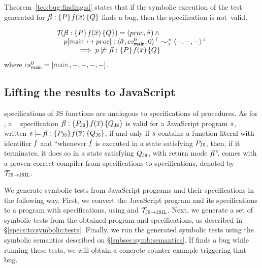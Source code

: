 Theorem~\ref{teo:bug:finding:sl} states that if the symbolic execution of the 
test generated for ${\mathit{fl}} : \{ P \} \, \mathit{f}(\overline{x}) \, \{ Q \}$ finds a bug, then the specification 
is not~valid.

\begin{theorem}\label{teo:bug:finding:sl}
$$
\begin{array}{l}
\testify{}(\specsig{\pass}{\pid(\jvec{x})}{\qass}{\flag})  = (\proc, \sstate) \, \wedge \\
\quad
  \prog[\jsilmain \mapsto \proc] :  \transabssemrule{\sstate, \csmain, 0}{-, -, -}{\top}{\bot}{\symbolic} \\ \quad \qquad 
    \implies  
         \prog \not\satisfies \specsig{\pass}{\pid(\jvec{x})}{\qass}{\flag}
\end{array}
$$
\noindent where  $\csmain = [ \jsilmain, -, -, -, - ]$.
\end{theorem}


\subsection{Lifting the results to JavaScript}

\javert specifications of JS functions are analogous to \jsil specifications of \jsil procedures.
As for \jsil, a \javert~\cite{javert} specification ${\mathit{fl}} : \{ P_{\mathtt{JS}} \} \, \mathit{f}(\overline{x}) \, \{ Q_{\mathtt{JS}} \}$
is valid for a JavaScript program $s$, written $s \models {\ensuremath{\mathit{fl}}} : \{ P_{\mathtt{JS}} \} \, \mathit{f}(\overline{x}) \, \{ Q_{\mathtt{JS}} \}$, 
if and only if $s$ contains a function literal with identifier $\mathit{f}$ and ``whenever $\mathit{f}$ is executed in a state satisfying $P_{\mathtt{JS}}$, then, 
if it terminates, it does so in a state satisfying $Q_{\mathtt{JS}}$, with return mode $\mathit{fl}$''. 
\javert comes with a proven correct compiler from \javert specifications to \jsil specifications, denoted by $\mathcal{T}_{\mathtt{JS}\rightarrow\mathtt{JSIL}}$. 

We generate symbolic tests from JavaScript programs and their \javert specifications in the following way. 
First, we convert the JavaScript program and its \javert specifications to a \jsil program with \jsil specifications, 
using \jstojsil and $\mathcal{T}_{\mathtt{JS}\rightarrow\mathtt{JSIL}}$. Next, we generate a set of symbolic tests from the obtained 
\jsil program and \jsil specifications, as described in \S\ref{specs:to:symbolic:tests}. 
Finally, we run the generated \jsil symbolic tests using the \jsil symbolic semantics described on \S\ref{subsec:symb:semantics}. 
If \cosette finds a bug while running these tests, we will obtain a concrete counter-example triggering that bug.


